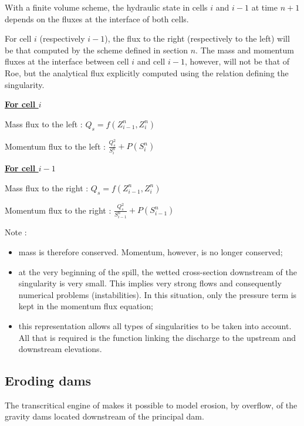 With a finite volume scheme, the hydraulic state in cells $i$ and $i-1$ at time $n+1$ depends on the fluxes at the interface of both cells.

For cell $i$ (respectively $i-1$), the flux to the right (respectively to the left) will be that computed by the scheme defined in section $n$. The mass and momentum fluxes at the interface between cell $i$ and cell $i-1$, however, will not be that of Roe, but the analytical flux explicitly computed using the relation defining the singularity.

\textbf{\underline{For cell $i$}}

Mass flux to the left : $Q_s =f(Z_{i-1}^n,Z_{i}^n)$

Momentum flux to the left : $\frac{Q_{s}^2}{S_{i}^n} + P(S_{i}^n)$

\textbf{\underline{For cell $i-1$}}

Mass flux to the right : $Q_s =f(Z_{i-1}^n,Z_{i}^n)$

Momentum flux to the right : $\frac{Q_{s}^2}{S_{i-1}^n} + P(S_{i-1}^n)$

\begin{CommentBlock}{Note :}
\begin{itemize}
 \item mass is therefore conserved. Momentum, however, is no longer conserved;
 \item at the very beginning of the spill, the wetted cross-section downstream of the singularity is very small. This implies very strong flows and consequently numerical problems (instabilities). In this situation, only the pressure term is kept in the momentum flux equation;
 \item this representation allows all types of singularities to be taken into account. All that is required is the function linking the discharge to the upstream and downstream elevations.
\end{itemize}
\end{CommentBlock}

\subsection{Eroding dams}

The transcritical engine of \mascaret{} makes it possible to model erosion, by overflow, of the gravity dams located downstream of the principal dam.

